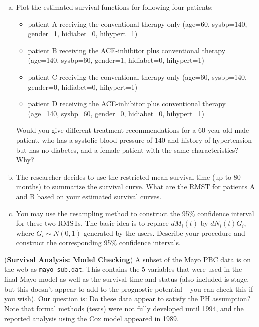 \documentclass[11pt,addpoints,answers]{exam}
\begin{document}
\begin{CJK*}{UTF8}{gbsn}
\begin{questions}
\begin{parts}
\begin{enumerate}[(a)]
	\item Plot the estimated survival functions for following four patients:
	\begin{itemize}
		\item patient A receiving the conventional therapy only 
			(age=60, sysbp=140, gender=1, hidiabet=0, hihypert=1)
		\item patient B receiving the ACE-inhibitor plus conventional therapy 
			(age=140, sysbp=60, gender=1, hidiabet=0, hihypert=1)
		\item patient C receiving the conventional therapy only 
			(age=60, sysbp=140, gender=0, hidiabet=0, hihypert=1)
		\item patient D receiving the ACE-inhibitor plus conventional therapy 
			(age=140, sysbp=60, gender=0, hidiabet=0, hihypert=1)
	\end{itemize}
	Would you give different treatment recommendations for a 60-year old male 
		patient, who has a systolic blood pressure of 140 and history of 
		hypertension but has no diabetes, and a female patient with the same 
		characteristics? Why?
	\item The researcher decides to use the restricted mean survival time (up to 
		80 months) to summarize the survival curve. What are the RMST for patients 
		A and B based on your estimated survival curves.
	\item You may use the resampling method to construct the 95\% confidence interval 
		for these two RMSTs. The basic idea is to replace $d M_i(t)$ by $d N_i(t)G_i$, 
		where $G_i \sim N(0, 1)$ generated by the users. Describe your procedure and 
		construct the corresponding 95\% confidence intervals.
\end{enumerate}

\end{parts}


\question[30]
(\textbf{Survival Analysis: Model Checking}) A subset of the Mayo PBC data is on the web as 
\texttt{mayo\_sub.dat}. This contains the 5 variables that were used in the final Mayo model as 
well as the survival time and status (also included is stage, but this doesn't appear to add 
to the prognostic potential – you can check this if you wish). Our question is: Do these 
data appear to satisfy the PH assumption? Note that formal methods (tests) were not fully 
developed until 1994, and the reported analysis using the Cox model appeared in 1989.

\begin{parts}

\end{parts}
\end{questions}
\end{CJK*}
\end{document}

